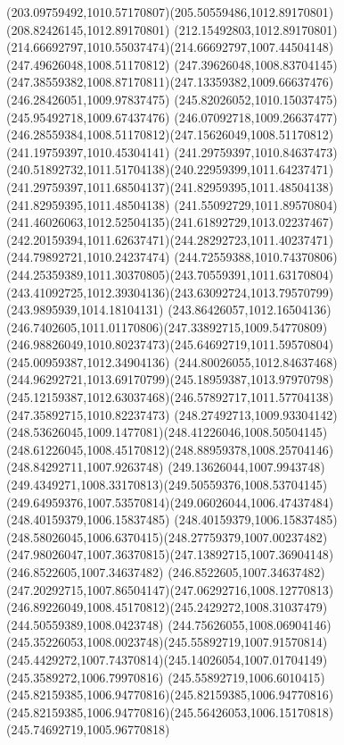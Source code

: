 {{	\curveto(203.09759492,1010.57170807)(205.50559486,1012.89170801)(208.82426145,1012.89170801)
	\curveto(212.15492803,1012.89170801)(214.66692797,1010.55037474)(214.66692797,1007.44504148)
	\moveto(247.49626048,1008.51170812)
	\lineto(247.39626048,1008.83704145)
	\curveto(247.38559382,1008.87170811)(247.13359382,1009.66637476)(246.28426051,1009.97837475)
	\lineto(245.82026052,1010.15037475)
	\lineto(245.95492718,1009.67437476)
	\curveto(246.07092718,1009.26637477)(246.28559384,1008.51170812)(247.15626049,1008.51170812)
	\closepath
	\moveto(241.19759397,1010.45304141)
	\curveto(241.29759397,1010.84637473)(240.51892732,1011.51704138)(240.22959399,1011.64237471)
	\curveto(241.29759397,1011.68504137)(241.82959395,1011.48504138)(241.82959395,1011.48504138)
	\curveto(241.55092729,1011.89570804)(241.46026063,1012.52504135)(241.61892729,1013.02237467)
	\curveto(242.20159394,1011.62637471)(244.28292723,1011.40237471)(244.79892721,1010.24237474)
	\curveto(244.72559388,1010.74370806)(244.25359389,1011.30370805)(243.70559391,1011.63170804)
	\curveto(243.41092725,1012.39304136)(243.63092724,1013.79570799)(243.9895939,1014.18104131)
	\curveto(243.86426057,1012.16504136)(246.7402605,1011.01170806)(247.33892715,1009.54770809)
	\curveto(246.98826049,1010.80237473)(245.64692719,1011.59570804)(245.00959387,1012.34904136)
	\curveto(244.80026055,1012.84637468)(244.96292721,1013.69170799)(245.18959387,1013.97970798)
	\curveto(245.12159387,1012.63037468)(246.57892717,1011.57704138)(247.35892715,1010.82237473)
	\curveto(248.27492713,1009.93304142)(248.53626045,1009.1477081)(248.41226046,1008.50504145)
	\curveto(248.61226045,1008.45170812)(248.88959378,1008.25704146)(248.84292711,1007.9263748)
	\curveto(249.13626044,1007.9943748)(249.4349271,1008.33170813)(249.50559376,1008.53704145)
	\curveto(249.64959376,1007.53570814)(249.06026044,1006.47437484)(248.40159379,1006.15837485)
	\curveto(248.40159379,1006.15837485)(248.58026045,1006.6370415)(248.27759379,1007.00237482)
	\curveto(247.98026047,1007.36370815)(247.13892715,1007.36904148)(246.8522605,1007.34637482)
	\curveto(246.8522605,1007.34637482)(247.20292715,1007.86504147)(247.06292716,1008.12770813)
	\curveto(246.89226049,1008.45170812)(245.2429272,1008.31037479)(244.50559389,1008.0423748)
	\curveto(244.75626055,1008.06904146)(245.35226053,1008.0023748)(245.55892719,1007.91570814)
	\curveto(245.4429272,1007.74370814)(245.14026054,1007.01704149)(245.3589272,1006.79970816)
	\curveto(245.55892719,1006.6010415)(245.82159385,1006.94770816)(245.82159385,1006.94770816)
	\curveto(245.82159385,1006.94770816)(245.56426053,1006.15170818)(245.74692719,1005.96770818)
}}
